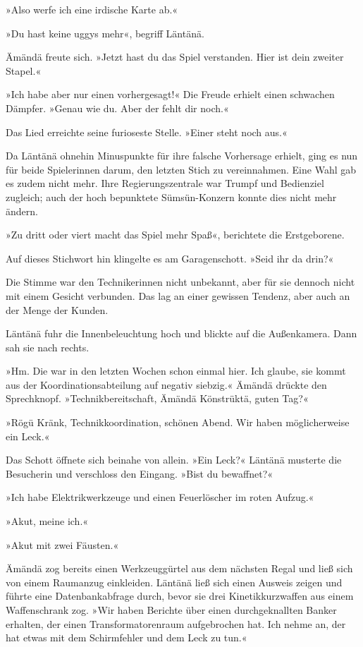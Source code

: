 »Also werfe ich eine irdische Karte ab.«

»Du hast keine uggys mehr«, begriff Läntänä.

Ämändä freute sich. »Jetzt hast du das Spiel verstanden. Hier ist dein zweiter Stapel.«

»Ich habe aber nur einen vorhergesagt!« Die Freude erhielt einen schwachen Dämpfer. »Genau wie du. Aber der fehlt dir noch.«

Das Lied erreichte seine furioseste Stelle. »Einer steht noch aus.«

Da Läntänä ohnehin Minuspunkte für ihre falsche Vorhersage erhielt, ging es nun für beide Spielerinnen darum, den letzten Stich zu vereinnahmen. Eine Wahl gab es zudem nicht mehr. Ihre Regierungszentrale war Trumpf und Bedienziel zugleich; auch der hoch bepunktete Sümsün-Konzern konnte dies nicht mehr ändern.

»Zu dritt oder viert macht das Spiel mehr Spaß«, berichtete die Erstgeborene.

Auf dieses Stichwort hin klingelte es am Garagenschott. »Seid ihr da drin?«

Die Stimme war den Technikerinnen nicht unbekannt, aber für sie dennoch nicht mit einem Gesicht verbunden. Das lag an einer gewissen Tendenz, aber auch an der Menge der Kunden.

Läntänä fuhr die Innenbeleuchtung hoch und blickte auf die Außenkamera. Dann sah sie nach rechts.

»Hm. Die war in den letzten Wochen schon einmal hier. Ich glaube, sie kommt aus der Koordinationsabteilung auf negativ siebzig.« Ämändä drückte den Sprechknopf. »Technikbereitschaft, Ämändä Könstrüktä, guten Tag?«

»Rögü Kränk, Technikkoordination, schönen Abend. Wir haben möglicherweise ein Leck.«

Das Schott öffnete sich beinahe von allein. »Ein Leck?« Läntänä musterte die Besucherin und verschloss den Eingang. »Bist du bewaffnet?«

»Ich habe Elektrikwerkzeuge und einen Feuerlöscher im roten Aufzug.«

»Akut, meine ich.«

»Akut mit zwei Fäusten.«

Ämändä zog bereits einen Werkzeuggürtel aus dem nächsten Regal und ließ sich von einem Raumanzug einkleiden. Läntänä ließ sich einen Ausweis zeigen und führte eine Datenbankabfrage durch, bevor sie drei Kinetikkurzwaffen aus einem Waffenschrank zog. »Wir haben Berichte über einen durchgeknallten Banker erhalten, der einen Transformatorenraum aufgebrochen hat. Ich nehme an, der hat etwas mit dem Schirmfehler und dem Leck zu tun.«

